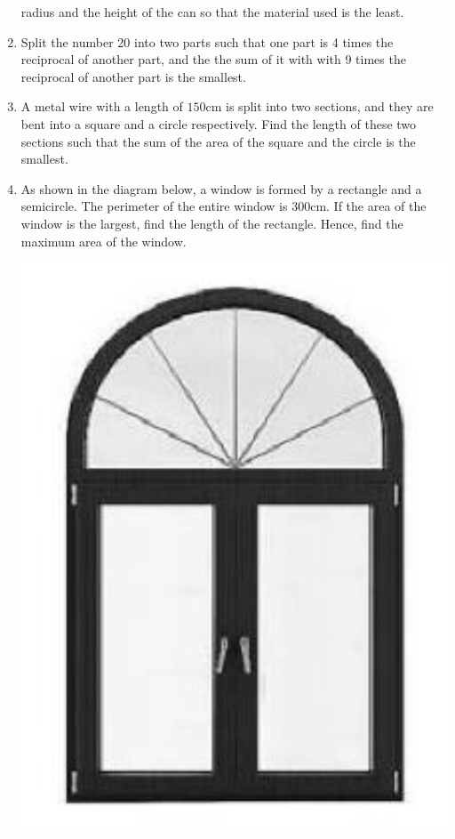 \documentclass{report}
\begin{document}
\begin{enumerate}
          radius and the height of the can so that the material used is the least.
    \item Split the number 20 into two parts such that one part is 4 times the reciprocal
          of another part, and the the sum of it with with 9 times the reciprocal of
          another part is the smallest.
    \item A metal wire with a length of $150$cm is split into two sections, and they are
          bent into a square and a circle respectively. Find the length of these two
          sections such that the sum of the area of the square and the circle is the
          smallest.
    \item As shown in the diagram below, a window is formed by a rectangle and a
          semicircle. The perimeter of the entire window is 300cm. If the area of the
          window is the largest, find the length of the rectangle. Hence, find the
          maximum area of the window.
          \begin{center}
              \includegraphics[scale=0.25]{assets/26-10.png}

\end{center}
\end{enumerate}
\end{document}

